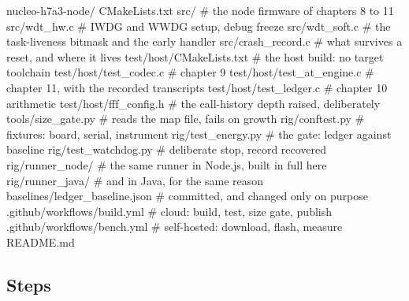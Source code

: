 \begin{plaincode}
nucleo-h7a3-node/
  CMakeLists.txt
  src/                           # the node firmware of chapters 8 to 11
  src/wdt_hw.c                   # IWDG and WWDG setup, debug freeze
  src/wdt_soft.c                 # the task-liveness bitmask and the early handler
  src/crash_record.c             # what survives a reset, and where it lives
  test/host/CMakeLists.txt       # the host build: no target toolchain
  test/host/test_codec.c         # chapter 9
  test/host/test_at_engine.c     # chapter 11, with the recorded transcripts
  test/host/test_ledger.c        # chapter 10 arithmetic
  test/host/fff_config.h         # the call-history depth raised, deliberately
  tools/size_gate.py             # reads the map file, fails on growth
  rig/conftest.py                # fixtures: board, serial, instrument
  rig/test_energy.py             # the gate: ledger against baseline
  rig/test_watchdog.py           # deliberate stop, record recovered
  rig/runner_node/               # the same runner in Node.js, built in full here
  rig/runner_java/               # and in Java, for the same reason
  baselines/ledger_baseline.json # committed, and changed only on purpose
  .github/workflows/build.yml    # cloud: build, test, size gate, publish
  .github/workflows/bench.yml    # self-hosted: download, flash, measure
  README.md
\end{plaincode}

\subsection*{Steps}

